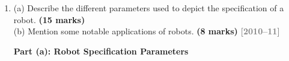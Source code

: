 \documentclass[12pt,a3paper]{article}
\newcommand{\yr}[1]{\hfill\textcolor{gray}{\small\textbf{[#1]}}}
\newcommand{\mk}[1]{\textcolor{orange!70!black}{\small\textbf{(#1 marks)}}}
\begin{document}
\begin{enumerate}
\begin{tcolorbox}[enhanced,breakable,ansbox,colback=cA!4,colframe=cA,
  boxrule=0.8pt,arc=5pt,
  title={\textbf{Answer}},fonttitle=\bfseries\color{white},colbacktitle=cA]
The cylindrical robot can rotate 360° about the vertical axis, extend the arm
radially, and move up/down — creating a hollow-cylinder workspace. It cannot
reach directly below itself or very close to its own axis.

\end{tcolorbox}

\item \label{qlabel:C1-Q10}
(a) Describe the different parameters used to depict the specification of a robot. \mk{15}\\
(b) Mention some notable applications of robots. \mk{8}
\yr{2010--11}

\begin{tcolorbox}[enhanced,breakable,ansbox,colback=cA!4,colframe=cA,
  boxrule=0.8pt,arc=5pt,
  title={\textbf{Answer}},fonttitle=\bfseries\color{white},colbacktitle=cA]

\textbf{Part (a): Robot Specification Parameters}


\end{tcolorbox}
\end{enumerate}
\end{document}
